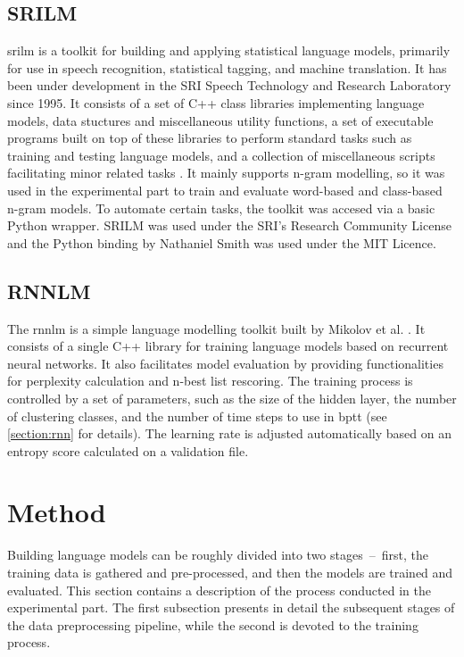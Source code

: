 \subsection{SRILM}
\gls{srilm} is a toolkit for building and applying statistical language models, primarily for use in speech recognition, statistical tagging, and machine translation. It has been under development in the SRI Speech Technology and Research Laboratory since 1995. It consists of a set of C++ class libraries implementing language models, data stuctures and miscellaneous utility functions, a set of executable programs built on top of these libraries to perform standard tasks such as training and testing language models, and a collection of miscellaneous scripts facilitating minor related tasks \cite{stolcke2011srilm}. It mainly supports n-gram modelling, so it was used in the experimental part to train and evaluate word-based and class-based n-gram models. To automate certain tasks, the toolkit was accesed via a basic Python wrapper. SRILM was used under the SRI's Research Community License and the Python binding by Nathaniel Smith was used under the MIT Licence.
\subsection{RNNLM}
The \gls{rnnlm} is a simple language modelling toolkit built by Mikolov et al. \cite{mikolov2011extensions}. It consists of a single C++ library for training language models based on recurrent neural networks. It also facilitates model evaluation by providing functionalities for perplexity calculation and n-best list rescoring. The training process is controlled by a set of parameters, such as the size of the hidden layer, the number of clustering classes, and the number of time steps to use in \gls{bptt} (see \ref{section:rnn} for details). The learning rate is adjusted automatically based on an entropy score calculated on a validation file.
\section{Method}
Building language models can be roughly divided into two stages~--~first, the training data is gathered and pre-processed, and then the models are trained and evaluated. This section contains a description of the process conducted in the experimental part. The first subsection presents in detail the subsequent stages of the data preprocessing pipeline, while the second is devoted to the training process.
